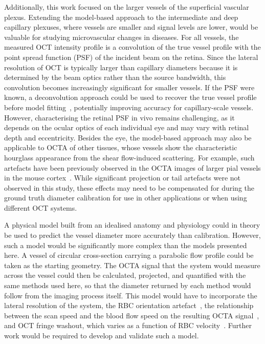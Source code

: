 \documentclass{optica-article}
\begin{document}
Additionally, this work focused on the larger vessels of the superficial vascular plexus. Extending the model-based approach to the intermediate and deep capillary plexuses, where vessels are smaller and signal levels are lower, would be valuable for studying microvascular changes in diseases. For all vessels, the measured OCT intensity profile is a convolution of the true vessel profile with the point spread function (PSF) of the incident beam on the retina. Since the lateral resolution of OCT is typically larger than capillary diameters because it is determined by the beam optics rather than the source bandwidth, this convolution becomes increasingly significant for smaller vessels. If the PSF were known, a deconvolution approach could be used to recover the true vessel profile before model fitting~\cite{abbasiDeconvolutionTechniquesOCT2025}, potentially improving accuracy for capillary-scale vessels. However, characterising the retinal PSF in vivo remains challenging, as it depends on the ocular optics of each individual eye and may vary with retinal depth and eccentricity. Besides the eye, the model-based approach may also be applicable to OCTA of other tissues, whose vessels show the characteristic hourglass appearance from the shear flow-induced scattering. For example, such artefacts have been previously observed in the OCTA images of larger pial vessels in the mouse cortex~\cite{merkleLaminarMicrovascularTransit2016}. While significant projection or tail artefacts were not observed in this study, these effects may need to be compensated for during the ground truth diameter calibration for use in other applications or when using different OCT systems.

A physical model built from an idealised anatomy and physiology could in theory be used to predict the vessel diameter more accurately than calibration. However, such a model would be significantly more complex than the models presented here. A vessel of circular cross-section carrying a parabolic flow profile could be taken as the starting geometry. The OCTA signal that the system would measure across the vessel could then be calculated, projected, and quantified with the same methods used here, so that the diameter returned by each method would follow from the imaging process itself. This model would have to incorporate the lateral resolution of the system, the RBC orientation artefact~\cite{cimallaShearFlowinducedOptical2011,bernucciInvestigationArtifactsRetinal2018}, the relationship between the scan speed and the blood flow speed on the resulting OCTA signal~\cite{plonerQuantitativeOpticalCoherence2016}, and OCT fringe washout, which varies as a function of RBC velocity~\cite{yunMotionArtifactsOptical2004,waltherSignalPowerDecrease2010}. Further work would be required to develop and validate such a model.
\end{document}
